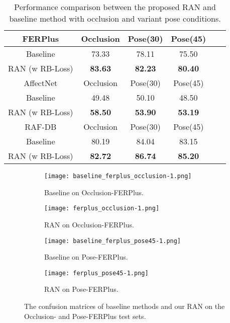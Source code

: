 \documentclass[journal]{IEEEtran}
\begin{document}
\begin{table}[t]
\center
\caption{\textcolor[rgb]{0.00,0.00,0.00}{Performance comparison between the proposed RAN and baseline method with occlusion and variant pose conditions.}}
\begin{tabular}{@{}cccccc@{}}
\hline
\toprule
FERPlus         & Occlusion & Pose(30) & Pose(45) \\ \midrule
Baseline &     73.33      &        78.11       &       75.50        \\
RAN (w RB-Loss) &     \textbf{83.63}      &        \textbf{82.23}          &      \textbf{80.40 }          \\
\hline
\toprule
AffectNet       & Occlusion & Pose(30) & Pose(45) \\\midrule
Baseline        &     49.48      &       50.10         &       48.50      \\
RAN (w RB-Loss) &    \textbf{58.50}     &         \textbf{53.90}      &      \textbf{ 53.19 }      \\ 
\toprule
RAF-DB         & Occlusion & Pose(30) & Pose(45) \\ \midrule
Baseline &     80.19      &        84.04       &       83.15        \\
RAN (w RB-Loss) &     \textbf{82.72}      &        \textbf{86.74}          &      \textbf{85.20 }          \\ \bottomrule
\end{tabular}
\label{tab:opose}
\end{table}



\begin{figure*}[t]
\captionsetup[subfigure]{labelformat=empty}
\begin{subfigure}{.24\textwidth}
  \centering
\texttt{[image: baseline\_ferplus\_occlusion-1.png]}  
  \caption{\small{Baseline on Occlusion-FERPlus.}}
  \label{fig:sub-first}
\end{subfigure}
\begin{subfigure}{.24\textwidth}
  \centering
\texttt{[image: ferplus\_occlusion-1.png]}  
  \caption{\small{ RAN on Occlusion-FERPlus.}}
  \label{fig:sub-second}
\end{subfigure}
\begin{subfigure}{.24\textwidth}
  \centering
\texttt{[image: baseline\_ferplus\_pose45-1.png]}  
  \caption{\small{Baseline on Pose-FERPlus.}}
  \label{fig:sub-third}
\end{subfigure}
\begin{subfigure}{.24\textwidth}
  \centering
\texttt{[image: ferplus\_pose45-1.png]}  
  \caption{\small{ RAN on Pose-FERPlus.}}
  \label{fig:sub-forth}
\end{subfigure}
\caption{The confusion  matrices of baseline methods and our RAN on the Occlusion- and Pose-FERPlus test sets.}
\label{fig:confusion_metrics_ferplus}
\end{figure*}
\end{document}
